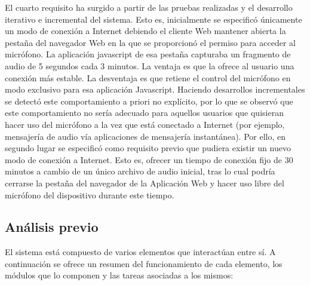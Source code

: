 El cuarto requisito ha surgido a partir de las pruebas realizadas y el desarrollo iterativo e incremental del sistema. Esto es, inicialmente se especificó únicamente un modo de conexión a Internet debiendo el cliente Web mantener abierta la pestaña del navegador Web en la que se proporcionó el permiso para acceder al micrófono. La aplicación javascript de esa pestaña capturaba un fragmento de audio de 5 segundos cada 3 minutos. La ventaja es que la ofrece al usuario una conexión más estable. La desventaja es que retiene el control del micrófono en modo exclusivo para esa aplicación Javascript. Haciendo desarrollos incrementales se detectó este comportamiento a priori no explícito, por lo que se observó que este comportamiento no sería adecuado para aquellos usuarios que quisieran hacer uso del micrófono a la vez que está conectado a Internet (por ejemplo, mensajería de audio vía aplicaciones de mensajería instantánea). Por ello, en segundo lugar se especificó como requisito previo que pudiera existir un nuevo modo de conexión a Internet. Esto es, ofrecer un tiempo de conexión fijo de 30 minutos a cambio de un único archivo de audio inicial, tras lo cual podría cerrarse la pestaña del navegador de la Aplicación Web y hacer uso libre del micrófono del dispositivo durante este tiempo.

\subsection{Análisis previo}

El sistema está compuesto de varios elementos que interactúan entre sí. A continuación se ofrece un resumen del funcionamiento de cada elemento, los módulos que lo componen y las tareas asociadas a los mismos:

